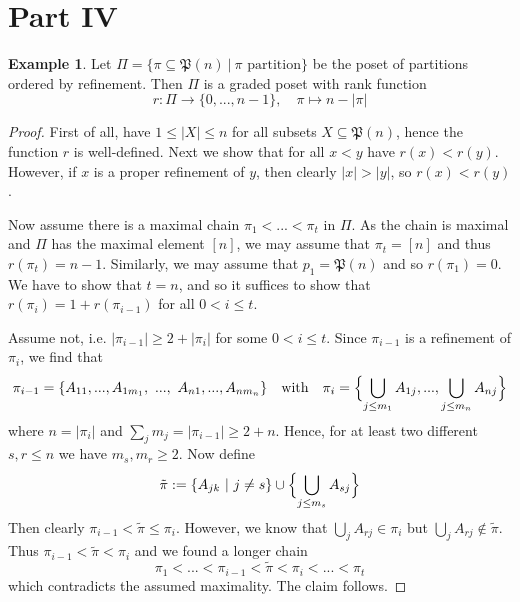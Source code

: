 \documentclass{scrartcl}
\newcommand{\powerset}{\mathfrak{P}}
\theoremstyle{definition}
\newtheorem{example}[definition]{Example}
\begin{document}
\section{Part IV}
\begin{example}
    Let $\Pi = \{ \pi \subseteq \powerset(n) \ | \ \text{$\pi$ partition} \}$ be the poset of partitions ordered by refinement.
    Then $\Pi$ is a graded poset with rank function
    \begin{equation*}
        r: \Pi \to \{ 0, ..., n - 1 \}, \quad \pi \mapsto n - |\pi|
    \end{equation*}
\end{example}
\begin{proof}
    First of all, have $1 \leq |X| \leq n$ for all subsets $X \subseteq \powerset(n)$, hence the function $r$ is well-defined.
    Next we show that for all $x < y$ have $r(x) < r(y)$.
    However, if $x$ is a proper refinement of $y$, then clearly $|x| > |y|$, so $r(x) < r(y)$.

    Now assume there is a maximal chain $\pi_1 < ... < \pi_t$ in $\Pi$.
    As the chain is maximal and $\Pi$ has the maximal element $[n]$, we may assume that $\pi_t = [n]$ and thus $r(\pi_t) = n - 1$.
    Similarly, we may assume that $p_1 = \powerset(n)$ and so $r(\pi_1) = 0$.
    We have to show that $t = n$, and so it suffices to show that $r(\pi_i) = 1 + r(\pi_{i - 1})$ for all $0 < i \leq t$.

    Assume not, i.e. $|\pi_{i - 1}| \geq 2 + |\pi_i|$ for some $0 < i \leq t$.
    Since $\pi_{i - 1}$ is a refinement of $\pi_i$, we find that
    \begin{equation*}
        \pi_{i - 1} = \{ A_{11}, ..., A_{1m_1}, \ ..., \ A_{n1}, ..., A_{nm_n} \} \quad \text{with} \quad \pi_i = \Bigl\{ \bigcup_{j \leq m_1} A_{1j}, ..., \bigcup_{j \leq m_n} A_{nj} \Bigr\}
    \end{equation*}
    where $n = |\pi_i|$ and $\sum_j m_j = |\pi_{i - 1}| \geq 2 + n$.
    Hence, for at least two different $s, r \leq n$ we have $m_s, m_r \geq 2$.
    Now define
    \begin{equation*}
        \tilde{\pi} := \{ A_{jk} \ | \ j \neq s \} \cup \Bigl\{ \bigcup_{j \leq m_s} A_{sj} \Bigr\}
    \end{equation*}
    Then clearly $\pi_{i - 1} < \tilde{\pi} \leq \pi_i$.
    However, we know that $\bigcup_j A_{rj} \in \pi_i$ but $\bigcup_j A_{rj} \notin \tilde{\pi}$.
    Thus $\pi_{i - 1} < \tilde{\pi} < \pi_i$ and we found a longer chain
    \begin{equation*}
        \pi_1 < ... < \pi_{i - 1} < \tilde{\pi} < \pi_i < ... < \pi_t
    \end{equation*}
    which contradicts the assumed maximality. The claim follows.
\end{proof}
\end{document}

